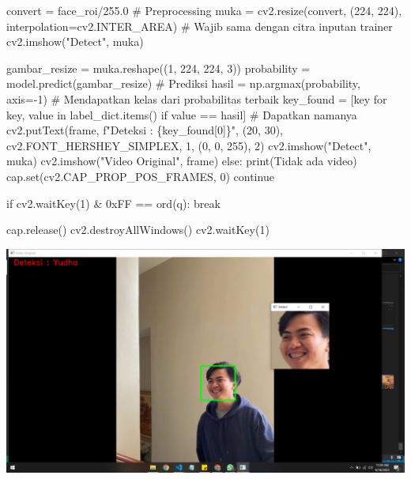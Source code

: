 \documentclass[
  letterpaper,
  DIV=11,
  numbers=noendperiod]{scrreprt}
\newenvironment{Shaded}{\begin{snugshade}}{\end{snugshade}}
\newcommand{\BaseNTok}[1]{\textcolor[rgb]{0.68,0.00,0.00}{#1}}
\newcommand{\BuiltInTok}[1]{\textcolor[rgb]{0.00,0.23,0.31}{#1}}
\newcommand{\CommentTok}[1]{\textcolor[rgb]{0.37,0.37,0.37}{#1}}
\newcommand{\ControlFlowTok}[1]{\textcolor[rgb]{0.00,0.23,0.31}{#1}}
\newcommand{\DecValTok}[1]{\textcolor[rgb]{0.68,0.00,0.00}{#1}}
\newcommand{\FloatTok}[1]{\textcolor[rgb]{0.68,0.00,0.00}{#1}}
\newcommand{\KeywordTok}[1]{\textcolor[rgb]{0.00,0.23,0.31}{#1}}
\newcommand{\NormalTok}[1]{\textcolor[rgb]{0.00,0.23,0.31}{#1}}
\newcommand{\OperatorTok}[1]{\textcolor[rgb]{0.37,0.37,0.37}{#1}}
\newcommand{\SpecialCharTok}[1]{\textcolor[rgb]{0.37,0.37,0.37}{#1}}
\newcommand{\SpecialStringTok}[1]{\textcolor[rgb]{0.13,0.47,0.30}{#1}}
\newcommand{\StringTok}[1]{\textcolor[rgb]{0.13,0.47,0.30}{#1}}
\begin{document}
\begin{Shaded}
\begin{Highlighting}[]
\NormalTok{            convert }\OperatorTok{=}\NormalTok{ face\_roi}\OperatorTok{/}\FloatTok{255.0}  \CommentTok{\# Preprocessing}
\NormalTok{            muka }\OperatorTok{=}\NormalTok{ cv2.resize(convert, (}\DecValTok{224}\NormalTok{, }\DecValTok{224}\NormalTok{), interpolation}\OperatorTok{=}\NormalTok{cv2.INTER\_AREA)  }\CommentTok{\# Wajib sama dengan citra inputan trainer}
\NormalTok{            cv2.imshow(}\StringTok{"Detect"}\NormalTok{, muka)}

\NormalTok{            gambar\_resize }\OperatorTok{=}\NormalTok{ muka.reshape((}\DecValTok{1}\NormalTok{, }\DecValTok{224}\NormalTok{, }\DecValTok{224}\NormalTok{, }\DecValTok{3}\NormalTok{))}
\NormalTok{            probability }\OperatorTok{=}\NormalTok{ model.predict(gambar\_resize)  }\CommentTok{\# Prediksi}
\NormalTok{            hasil }\OperatorTok{=}\NormalTok{ np.argmax(probability, axis}\OperatorTok{={-}}\DecValTok{1}\NormalTok{)  }\CommentTok{\# Mendapatkan kelas dari probabilitas terbaik}
\NormalTok{            key\_found }\OperatorTok{=}\NormalTok{ [key }\ControlFlowTok{for}\NormalTok{ key, value }\KeywordTok{in}\NormalTok{ label\_dict.items() }\ControlFlowTok{if}\NormalTok{ value }\OperatorTok{==}\NormalTok{ hasil]  }\CommentTok{\# Dapatkan namanya}
\NormalTok{            cv2.putText(frame, }\SpecialStringTok{f"Deteksi : }\SpecialCharTok{\{}\NormalTok{key\_found[}\DecValTok{0}\NormalTok{]}\SpecialCharTok{\}}\SpecialStringTok{"}\NormalTok{, (}\DecValTok{20}\NormalTok{, }\DecValTok{30}\NormalTok{), cv2.FONT\_HERSHEY\_SIMPLEX, }\DecValTok{1}\NormalTok{, (}\DecValTok{0}\NormalTok{, }\DecValTok{0}\NormalTok{, }\DecValTok{255}\NormalTok{), }\DecValTok{2}\NormalTok{)}
\NormalTok{            cv2.imshow(}\StringTok{"Detect"}\NormalTok{, muka)}
\NormalTok{        cv2.imshow(}\StringTok{"Video Original"}\NormalTok{, frame)}
    \ControlFlowTok{else}\NormalTok{:}
        \BuiltInTok{print}\NormalTok{(}\StringTok{\textquotesingle{}Tidak ada video\textquotesingle{}}\NormalTok{)}
\NormalTok{        cap.}\BuiltInTok{set}\NormalTok{(cv2.CAP\_PROP\_POS\_FRAMES, }\DecValTok{0}\NormalTok{)}
        \ControlFlowTok{continue}

    \ControlFlowTok{if}\NormalTok{ cv2.waitKey(}\DecValTok{1}\NormalTok{) }\OperatorTok{\&} \BaseNTok{0xFF} \OperatorTok{==} \BuiltInTok{ord}\NormalTok{(}\StringTok{\textquotesingle{}q\textquotesingle{}}\NormalTok{):}
        \ControlFlowTok{break}

\NormalTok{cap.release()}
\NormalTok{cv2.destroyAllWindows()}
\NormalTok{cv2.waitKey(}\DecValTok{1}\NormalTok{)}
\end{Highlighting}
\end{Shaded}

\includegraphics{Asset/testtflearning_input.png}
\end{document}
